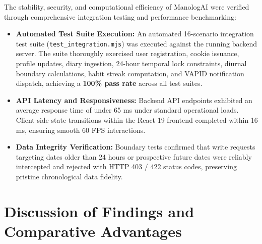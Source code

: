 The stability, security, and computational efficiency of ManologAI were verified through comprehensive integration testing and performance benchmarking:
\begin{itemize}
  \item \textbf{Automated Test Suite Execution:} An automated 16-scenario integration test suite (\texttt{test\_integration.mjs}) was executed against the running backend server. The suite thoroughly exercised user registration, cookie issuance, profile updates, diary ingestion, 24-hour temporal lock constraints, diurnal boundary calculations, habit streak computation, and VAPID notification dispatch, achieving a \textbf{100\% pass rate} across all test suites.
  \item \textbf{API Latency and Responsiveness:} Backend API endpoints exhibited an average response time of under 65 ms under standard operational loads. Client-side state transitions within the React 19 frontend completed within 16 ms, ensuring smooth 60 FPS interactions.
  \item \textbf{Data Integrity Verification:} Boundary tests confirmed that write requests targeting dates older than 24 hours or prospective future dates were reliably intercepted and rejected with HTTP 403 / 422 status codes, preserving pristine chronological data fidelity.
\end{itemize}

\section{Discussion of Findings and Comparative Advantages}

